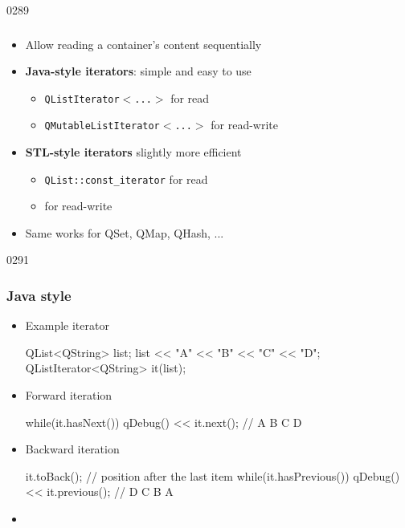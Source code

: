 \begin{slide}{0289}\frametitle{}
\begin{itemize}
  \item Allow reading a container's content sequentially
 \item \textbf{Java-style iterators}: simple and easy to use
  \begin{itemize}
    \item \texttt{QListIterator$<$...$>$} for read
    \item \texttt{QMutableListIterator$<$...$>$} for read-write
 \end{itemize}
  \item \textbf{STL-style iterators} slightly more efficient
  \begin{itemize}
    \item \texttt{QList::const\_iterator} for read
    \item {} for read-write
 \end{itemize}
    \item Same works for QSet, QMap, QHash, ...
\end{itemize}
\end{slide}

\begin{slide}[fragile]{0291}\frametitle{ {Java style}}\label{java-style-iterators}
\begin{itemize}
  \item Example  iterator
  \begin{cpp}
QList<QString> list;
list << "A" << "B" << "C" << "D";
QListIterator<QString> it(list);
  \end{cpp}
  \item Forward iteration
  \begin{cpp}
while(it.hasNext()) {
  qDebug() << it.next();    // A B C D
}  
  \end{cpp}
  \item Backward iteration
  \begin{cpp}
it.toBack(); // position after the last item
while(it.hasPrevious()) {
  qDebug() << it.previous(); // D C B A
}  
  \end{cpp}  
  \item[] 
\end{itemize}  
\end{slide}

